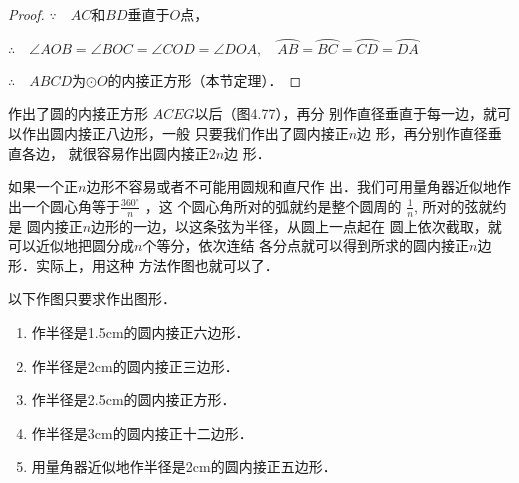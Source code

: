 \begin{proof}
 $\because\quad AC$和$BD$垂直于$O$点，

$\therefore\quad \angle AOB=\angle BOC=\angle COD=\angle DOA,\quad 
  \wideparen{AB}=\wideparen{BC}=\wideparen{CD}=\wideparen{DA}$

  $\therefore\quad ABCD$为$\odot O$的内接正方形（本节定理）．
\end{proof}

\begin{figure}[htp]\centering
  \begin{minipage}[t]{0.48\textwidth}
  \centering
{}
  \caption{}
  \end{minipage}
  \begin{minipage}[t]{0.48\textwidth}
  \centering
  \caption{}
  \end{minipage}
  \end{figure}

  作出了圆的内接正方形
  $ACEG$以后（图4.77），再分
  别作直径垂直于每一边，就可
  以作出圆内接正八边形，一般
  只要我们作出了圆内接正$n$边
  形，再分别作直径垂直各边，
  就很容易作出圆内接正$2n$边
  形．

  如果一个正$n$边形不容易或者不可能用圆规和直尺作
  出．我们可用量角器近似地作出一个圆心角等于$\frac{360^{\circ}}{n}$
  ，这
  个圆心角所对的弧就约是整个圆周的
  $\frac{1}{n}$, 所对的弦就约是
  圆内接正$n$边形的一边，以这条弦为半径，从圆上一点起在
  圆上依次截取，就可以近似地把圆分成$n$个等分，依次连结
  各分点就可以得到所求的圆内接正$n$边形．实际上，用这种
  方法作图也就可以了．

\begin{ex}
  以下作图只要求作出图形．
  \begin{enumerate}
    \item 作半径是1.5cm的圆内接正六边形．
    \item 作半径是2cm的圆内接正三边形．
    \item 作半径是2.5cm的圆内接正方形．
    \item 作半径是3cm的圆内接正十二边形．
    \item 用量角器近似地作半径是2cm的圆内接正五边形．
  \end{enumerate}
\end{ex}

